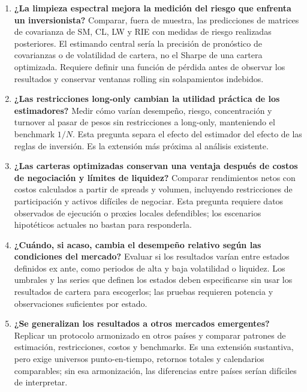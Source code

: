 \documentclass[11pt]{article}
\begin{document}
\begin{enumerate}
\item \textbf{¿La limpieza espectral mejora la medición del riesgo que enfrenta
un inversionista?} Comparar, fuera de muestra, las predicciones de matrices de
covarianza de SM, CL, LW y RIE con medidas de riesgo realizadas posteriores.
El estimando central sería la precisión de pronóstico de covarianzas o de
volatilidad de cartera, no el Sharpe de una cartera optimizada. Requiere
definir una función de pérdida antes de observar los resultados y conservar
ventanas rolling sin solapamientos indebidos.

\item \textbf{¿Las restricciones long-only cambian la utilidad práctica de
los estimadores?} Medir cómo varían desempeño, riesgo, concentración y
turnover al pasar de pesos sin restricciones a long-only, manteniendo el
benchmark $1/N$. Esta pregunta separa el efecto del estimador del efecto de
las reglas de inversión. Es la extensión más próxima al análisis existente.

\item \textbf{¿Las carteras optimizadas conservan una ventaja después de
costos de negociación y límites de liquidez?} Comparar rendimientos netos
con costos calculados a partir de spreads y volumen, incluyendo restricciones
de participación y activos difíciles de negociar. Esta pregunta requiere
datos observados de ejecución o proxies locales defendibles; los escenarios
hipotéticos actuales no bastan para responderla.

\item \textbf{¿Cuándo, si acaso, cambia el desempeño relativo según las
condiciones del mercado?} Evaluar si los resultados varían entre estados
definidos ex ante, como periodos de alta y baja volatilidad o liquidez. Los
umbrales y las series que definen los estados deben especificarse sin usar
los resultados de cartera para escogerlos; las pruebas requieren potencia y
observaciones suficientes por estado.

\item \textbf{¿Se generalizan los resultados a otros mercados emergentes?}
Replicar un protocolo armonizado en otros países y comparar patrones de
estimación, restricciones, costos y benchmarks. Es una extensión sustantiva,
pero exige universos punto-en-tiempo, retornos totales y calendarios
comparables; sin esa armonización, las diferencias entre países serían
difíciles de interpretar.
\end{enumerate}
\end{document}
